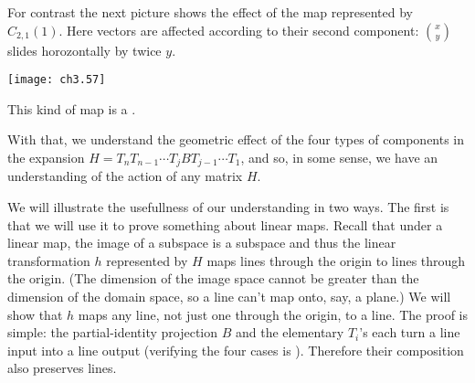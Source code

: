 For contrast the next picture shows the effect of the map represented by 
$C_{2,1}(1)$.
Here vectors are affected according to their  
second component:
$\binom{x}{y}$ slides horozontally by twice $y$.
\begin{center}
  \texttt{[image: ch3.57]}
\end{center}
This kind of map is a 
.

With that, we understand the geometric effect of the four types 
of components in the expansion
$H=T_nT_{n-1}\cdots T_jBT_{j-1}\cdots T_1$,
and so, in some sense, we have an understanding  
of the action of any matrix $H$.

We will illustrate the usefullness of our understanding in two ways.
The first is that we will use it to prove something about linear maps. 
Recall that under a linear map, the image of a subspace is a subspace
and thus the linear transformation $h$ represented by $H$ maps lines 
through the origin to lines through the origin.
(The dimension of the image space cannot be greater than 
the dimension of the domain space, so a line can't map onto, say, a plane.)
We will show that $h$ maps any line, 
not just one through the origin, 
to a line.
The proof is simple:
the partial-identity projection $B$ and the elementary $T_i$'s
each turn a line input into a line output 
(verifying the four cases is ).
Therefore their composition also preserves lines.

